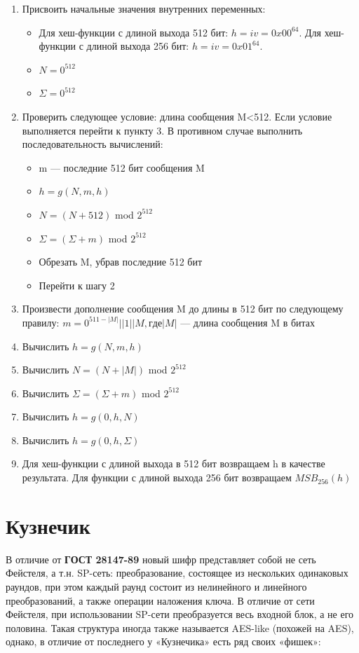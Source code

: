\documentclass[a4paper,14pt]{report}
\begin{document}
\begin{enumerate}
  \item Присвоить начальные значения внутренних переменных: 
  \begin{itemize}
	\item Для хеш-функции с длиной выхода 512 бит: $h=iv=0x00^{64}$. Для хеш-функции с длиной выхода 256 бит: $h=iv=0x01^{64}$.
	\item $N = 0^{512}$
	\item $\Sigma = 0^{512}$
  \end{itemize}
  \item Проверить следующее условие: длина сообщения M<512. Если условие выполняется перейти к пункту 3. В противном случае выполнить последовательность вычислений:
  \begin{itemize}
	\item m — последние 512 бит сообщения M
	\item $h = g(N, m, h)$
	\item $N = (N + 512)$ mod $2^{512}$
	\item $\Sigma = (\Sigma + m)$ mod $2^{512}$
	\item Обрезать M, убрав последние 512 бит
	\item Перейти к шагу 2
  \end{itemize}
\item Произвести дополнение сообщения M до длины в 512 бит по следующему правилу: 
$m = 0^{511-|M|} ||1||M, где |M|$ — длина сообщения M в битах
\item Вычислить $h = g(N, m, h)$
\item Вычислить $N = (N + |M|)$ mod $2^{512}$
\item Вычислить $\Sigma = (\Sigma + m)$ mod $2^{512}$
\item Вычислить $h = g(0, h, N)$
\item Вычислить $h = g(0, h, \Sigma)$
\item Для хеш-функции с длиной выхода в 512 бит возвращаем h в качестве результата. Для функции с длиной выхода 256 бит возвращаем $MSB_{256}(h)$
 \end{enumerate}
  
  
  
\section{Кузнечик}

В отличие от \textbf{ГОСТ 28147-89} новый шифр представляет собой не сеть Фейстеля, а т.н. SP-сеть: преобразование, состоящее из нескольких одинаковых раундов, при этом каждый раунд состоит из нелинейного и линейного преобразований, а также операции наложения ключа. В отличие от сети Фейстеля, при использовании SP-сети преобразуется весь входной блок, а не его половина. Такая структура иногда также называется AES-like (похожей на AES), однако, в отличие от последнего у «Кузнечика» есть ряд своих «фишек»:
\end{document}
